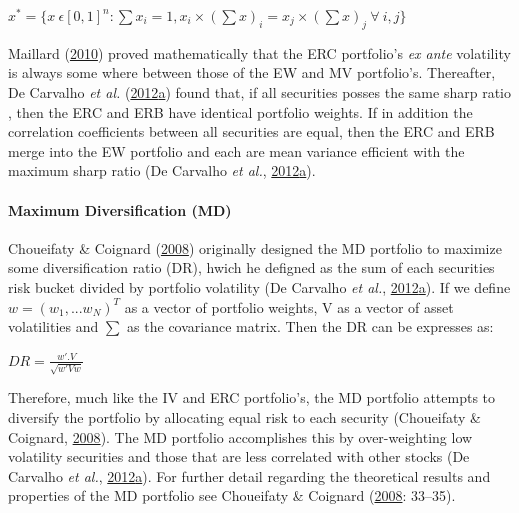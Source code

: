 \documentclass[11pt,preprint, authoryear]{elsarticle}
\numberwithin{equation}{section}
\numberwithin{figure}{section}
\numberwithin{table}{section}
\begin{document}
\begin{center}
$x^*=\{x \ \epsilon[0,1]^n:\sum x_i=1, x_i \times (\sum x)_i=x_j \times (\sum x)_j \ \forall  \ i,j \}$ 
\end{center}

Maillard (\protect\hyperlink{ref-maillard2010}{2010}) proved
mathematically that the ERC portfolio's \emph{ex ante} volatility is
always some where between those of the EW and MV portfolio's.
Thereafter, De Carvalho \emph{et al.}
(\protect\hyperlink{ref-leote}{2012}\protect\hyperlink{ref-leote}{a})
found that, if all securities posses the same sharp ratio , then the ERC
and ERB have identical portfolio weights. If in addition the correlation
coefficients between all securities are equal, then the ERC and ERB
merge into the EW portfolio and each are mean variance efficient with
the maximum sharp ratio (De Carvalho \emph{et al.},
\protect\hyperlink{ref-leote}{2012}\protect\hyperlink{ref-leote}{a}).

\hypertarget{maximum-diversification-md}{%
\paragraph{Maximum Diversification
(MD)}\label{maximum-diversification-md}}

Choueifaty \& Coignard (\protect\hyperlink{ref-choueifaty2008}{2008})
originally designed the MD portfolio to maximize some diversification
ratio (DR), hwich he defigned as the sum of each securities risk bucket
divided by portfolio volatility (De Carvalho \emph{et al.},
\protect\hyperlink{ref-leote}{2012}\protect\hyperlink{ref-leote}{a}). If
we define \(w=(w_1,...w_N)^T\) as a vector of portfolio weights, V as a
vector of asset volatilities and \(\sum\) as the covariance matrix. Then
the DR can be expresses as:

\begin{center} 
$DR= \frac{w'.V}{\sqrt{w'Vw}}$ 
\end{center}

Therefore, much like the IV and ERC portfolio's, the MD portfolio
attempts to diversify the portfolio by allocating equal risk to each
security (Choueifaty \& Coignard,
\protect\hyperlink{ref-choueifaty2008}{2008}). The MD portfolio
accomplishes this by over-weighting low volatility securities and those
that are less correlated with other stocks (De Carvalho \emph{et al.},
\protect\hyperlink{ref-leote}{2012}\protect\hyperlink{ref-leote}{a}).
For further detail regarding the theoretical results and properties of
the MD portfolio see Choueifaty \& Coignard
(\protect\hyperlink{ref-choueifaty2008}{2008}: 33--35).
\end{document}
